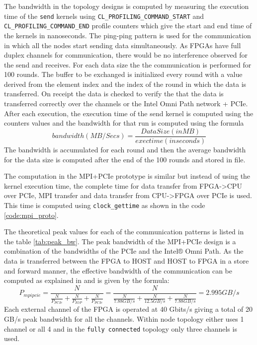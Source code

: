 The bandwidth in the topology designs is computed by measuring the execution time
of the \texttt{send} kernels using \texttt{CL\_PROFILING\_COMMAND\_START}
and \texttt{CL\_PROFILING\_COMMAND\_END} profile counters which give the start and
end time of the kernels in nanoseconds. The ping-ping pattern is used for the
communication in which all the nodes start sending data simultaneously.
As FPGAs have full duplex channels for communication, there would be no interference
observed for the send and receives. For each data size the the communication is performed
for 100 rounds. The buffer to be exchanged is initialized every round with a value derived from the
element index and the index of the round in which the data is transferred. On receipt
the data is checked to verify the that the data is transferred correctly over the channels
or the Intel Omni Path network + PCIe. After each execution, the execution time of the send kernel
is computed using the counters values and the bandwidth for that run is computed using the formula
$$ bandwidth (MB/Secs) = \frac{Data Size (in MB)}{exectime (in seconds)} $$
The bandwidth is accumulated for each round and then the average bandwidth for the
data size is computed after the end of the 100 rounds and stored in file.

The computation in the MPI+PCIe prototype is similar but instead of using the kernel execution
time, the complete time for data transfer from FPGA->CPU over PCIe, MPI transfer and data transfer from
CPU->FPGA over PCIe is used. This time is computed using \texttt{clock\_gettime} as shown in the code
\ref{code:mpi_proto}.

The theoretical peak values for each of the communication patterns is listed in the table \ref{tab:peak_bw}.
The peak bandwidth of the MPI+PCIe design is a combination of the bandwidths of the PCIe
and the Intel® Omni Path. As the data is transferred between the FPGA to HOST and HOST to FPGA
in a store and forward manner, the effective bandwidth of the communication can be computed as
explained in \cite{kobayashi_opencl-ready_2018} and is given by the formula:
\begin{equation}\label{eqn:peakbw_mpipcie}
 P_{mpipcie} = \frac{N}{\frac{N}{P_{PCIe}}+\frac{N}{P_{IOP}}+\frac{N}{P_{PCIe}}}
 = \frac{N}{\frac{N}{7.88 GB/s}+\frac{N}{12.5 GB/s}+\frac{N}{7.88 GB/s}} = 2.995 GB/s
\end{equation}
Each external channel of the FPGA is operated at 40 Gbits/s giving a total of 20 GB/s peak
bandwidth for all the channels. Within node topology either uses 1 channel or all 4 and in the
\texttt{fully connected} topology only three channels is used.


